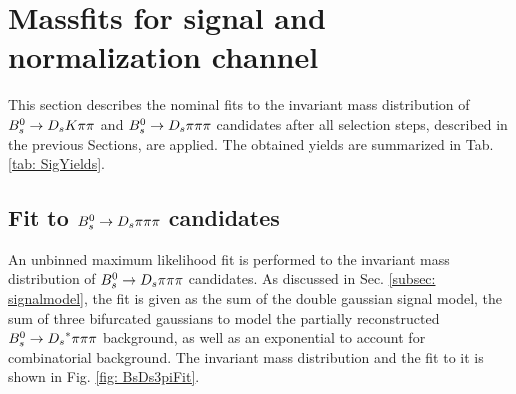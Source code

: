 \section{Massfits for signal and normalization channel}
\label{sec: fitting}

This section describes the nominal fits to the invariant mass distribution of ${{B}^0_{s}}\rightarrow{\ensuremath{{D}_{s}}}{\ensuremath{K}}{\ensuremath{\pi}}{\ensuremath{\pi}}$ and ${{B}^0_{s}}\rightarrow{\ensuremath{{D}_{s}}}{\ensuremath{\pi}}{\ensuremath{\pi}}{\ensuremath{\pi}}$ candidates after all selection steps, described in the previous Sections, are applied. 
The obtained yields are summarized in Tab. \ref{tab: SigYields}.

\subsection{Fit to ${{B}^0_{s}}\rightarrow{\ensuremath{{D}_{s}}}{\ensuremath{\pi}}{\ensuremath{\pi}}{\ensuremath{\pi}}$ candidates}
\label{subsec: NormFit}

An unbinned maximum likelihood fit is performed to the invariant mass distribution of ${{B}^0_{s}}\rightarrow{\ensuremath{{D}_{s}}}{\ensuremath{\pi}}{\ensuremath{\pi}}{\ensuremath{\pi}}$ candidates. 
As discussed in Sec. \ref{subsec: signalmodel}, the fit is given as the sum of the double gaussian signal model, the sum of three bifurcated gaussians to model the partially reconstructed ${{B}^0_{s}}\rightarrow{\ensuremath{{D}_{s}}}^{*}{\pi}{\pi}{\pi}$ background, as well as an exponential to account for combinatorial background. The invariant mass distribution and the fit to it is shown in Fig. \ref{fig: BsDs3piFit}.

